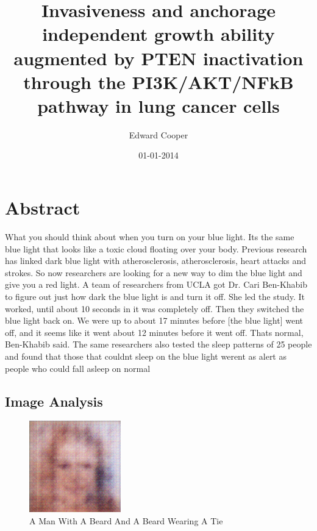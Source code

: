 \documentclass{article}%
\title{Invasiveness and anchorage independent growth ability augmented by PTEN inactivation through the PI3K/AKT/NFkB pathway in lung cancer cells}%
\author{Edward Cooper}%
\affil{Department of Surgery, Faculty of Medicine, School of Medicine, Kaohsiung Medical University, Kaohsiung, Taiwan}%
\date{01{-}01{-}2014}%
\begin{document}
%
\normalsize%
\maketitle%
\section{Abstract}%
\label{sec:Abstract}%
What you should think about when you turn on your blue light.\newline%
Its the same blue light that looks like a toxic cloud floating over your body.\newline%
Previous research has linked dark blue light with atherosclerosis, atherosclerosis, heart attacks and strokes.\newline%
So now researchers are looking for a new way to dim the blue light and give you a red light.\newline%
A team of researchers from UCLA got Dr. Cari Ben{-}Khabib to figure out just how dark the blue light is and turn it off.\newline%
She led the study.\newline%
It worked, until about 10 seconds in it was completely off.\newline%
Then they switched the blue light back on.\newline%
We were up to about 17 minutes before {[}the blue light{]} went off, and it seems like it went about 12 minutes before it went off. Thats normal, Ben{-}Khabib said.\newline%
The same researchers also tested the sleep patterns of 25 people and found that those that couldnt sleep on the blue light werent as alert as people who could fall asleep on normal

%
\subsection{Image Analysis}%
\label{subsec:ImageAnalysis}%


\begin{figure}[h!]%
\centering%
\includegraphics[width=150px]{500_fake_images/samples_5_38.png}%
\caption{A Man With A Beard And A Beard Wearing A Tie}%
\end{figure}

%
\end{document}
